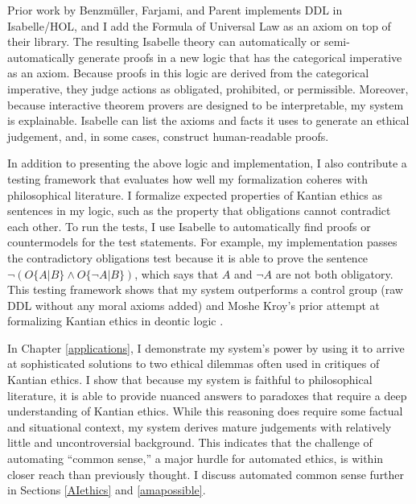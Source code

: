 \begin{isabellebody}
\begin{isamarkuptext}
Prior work by Benzmüller, Farjami, and Parent \citep{logikey, BFP} implements DDL in Isabelle/HOL, and 
I add the Formula of Universal Law as an axiom on top of their library. The resulting Isabelle theory 
can automatically or semi-automatically generate proofs in a new logic that has the categorical 
imperative as an axiom. Because proofs in this logic are derived from the categorical imperative, 
they judge actions as obligated, prohibited, or permissible. Moreover, because interactive 
theorem provers are designed to be interpretable, my system is explainable. Isabelle can list 
the axioms and facts it uses to generate an ethical judgement, and, in some cases, construct 
human-readable proofs. 

In addition to presenting the above logic and implementation, I also contribute a testing framework 
that evaluates how well my formalization coheres with philosophical literature. I formalize expected 
properties of Kantian ethics as sentences in my logic, such as the property that obligations cannot 
contradict each other. To run the tests, I use Isabelle to automatically find proofs or 
countermodels for the test statements. For example, my implementation passes the contradictory 
obligations test because it is able to prove the sentence $\neg (O\{A|B\} \wedge O\{\neg A | B\})$, 
which says that $A$ and $\neg A$ are not both obligatory. This testing framework shows that my system 
outperforms a control group (raw DDL without any moral axioms added) and 
Moshe Kroy's prior attempt at formalizing Kantian ethics in deontic logic \citep{kroy}.

In Chapter \ref{applications}, I demonstrate my system's power by using it to arrive at sophisticated
solutions to two ethical dilemmas often used in critiques of Kantian ethics. I show that because my system is 
faithful to philosophical literature, it is able to provide nuanced answers to paradoxes that require a
deep understanding of Kantian ethics. While this reasoning does require some factual and situational
context, my system derives mature judgements with relatively little and uncontroversial background.
This indicates that the challenge of automating ``common sense,'' a major hurdle for automated ethics, 
is within closer reach than previously thought. I discuss automated common sense further in
Sections \ref{AIethics} and \ref{amapossible}.


\end{isamarkuptext}
\end{isabellebody}
